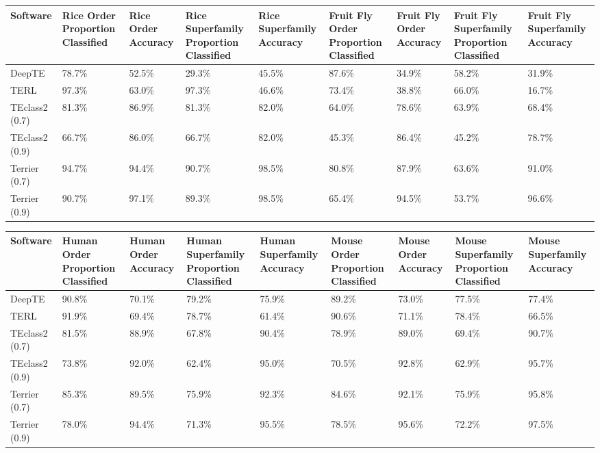 \begin{tabular}{lllllllll}
\toprule
Software & Rice Order Proportion Classified & Rice Order Accuracy & Rice Superfamily Proportion Classified & Rice Superfamily Accuracy & Fruit Fly Order Proportion Classified & Fruit Fly Order Accuracy & Fruit Fly Superfamily Proportion Classified & Fruit Fly Superfamily Accuracy \\
\midrule
DeepTE & 78.7\% & 52.5\% & 29.3\% & 45.5\% & 87.6\% & 34.9\% & 58.2\% & 31.9\% \\
TERL & 97.3\% & 63.0\% & 97.3\% & 46.6\% & 73.4\% & 38.8\% & 66.0\% & 16.7\% \\
TEclass2 (0.7) & 81.3\% & 86.9\% & 81.3\% & 82.0\% & 64.0\% & 78.6\% & 63.9\% & 68.4\% \\
TEclass2 (0.9) & 66.7\% & 86.0\% & 66.7\% & 82.0\% & 45.3\% & 86.4\% & 45.2\% & 78.7\% \\
Terrier (0.7) & 94.7\% & 94.4\% & 90.7\% & 98.5\% & 80.8\% & 87.9\% & 63.6\% & 91.0\% \\
Terrier (0.9) & 90.7\% & 97.1\% & 89.3\% & 98.5\% & 65.4\% & 94.5\% & 53.7\% & 96.6\% \\
\bottomrule
\end{tabular}


\begin{tabular}{lllllllll}
\toprule
Software & Human Order Proportion Classified & Human Order Accuracy & Human Superfamily Proportion Classified & Human Superfamily Accuracy & Mouse Order Proportion Classified & Mouse Order Accuracy & Mouse Superfamily Proportion Classified & Mouse Superfamily Accuracy \\
\midrule
DeepTE & 90.8\% & 70.1\% & 79.2\% & 75.9\% & 89.2\% & 73.0\% & 77.5\% & 77.4\% \\
TERL & 91.9\% & 69.4\% & 78.7\% & 61.4\% & 90.6\% & 71.1\% & 78.4\% & 66.5\% \\
TEclass2 (0.7) & 81.5\% & 88.9\% & 67.8\% & 90.4\% & 78.9\% & 89.0\% & 69.4\% & 90.7\% \\
TEclass2 (0.9) & 73.8\% & 92.0\% & 62.4\% & 95.0\% & 70.5\% & 92.8\% & 62.9\% & 95.7\% \\
Terrier (0.7) & 85.3\% & 89.5\% & 75.9\% & 92.3\% & 84.6\% & 92.1\% & 75.9\% & 95.8\% \\
Terrier (0.9) & 78.0\% & 94.4\% & 71.3\% & 95.5\% & 78.5\% & 95.6\% & 72.2\% & 97.5\% \\
\bottomrule
\end{tabular}
